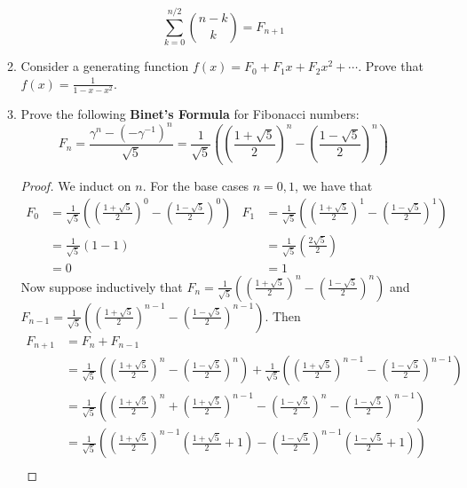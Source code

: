 \documentclass[../apprentice.tex]{subfiles}
\begin{document}
\begin{enumerate}
\begin{enumerate}
        \begin{equation*}
            \sum_{k=0}^{n/2}\binom{n-k}{k} = F_{n+1}
        \end{equation*}
        \item Consider a generating function $f(x)=F_0+F_1x+F_2x^2+\cdots$. Prove that $f(x)=\frac{1}{1-x-x^2}$.
        \item Prove the following \textbf{Binet's Formula} for Fibonacci numbers:
        \begin{equation*}
            F_n = \frac{\gamma^n-(-\gamma^{-1})^n}{\sqrt{5}}
            = \frac{1}{\sqrt{5}}\left( \left( \frac{1+\sqrt{5}}{2} \right)^n-\left( \frac{1-\sqrt{5}}{2} \right)^n \right)
        \end{equation*}
        \begin{proof}
            We induct on $n$. For the base cases $n=0,1$, we have that
            \begin{align*}
                F_0 &= \frac{1}{\sqrt{5}}\left( \left( \frac{1+\sqrt{5}}{2} \right)^0-\left( \frac{1-\sqrt{5}}{2} \right)^0 \right)&
                    F_1 &= \frac{1}{\sqrt{5}}\left( \left( \frac{1+\sqrt{5}}{2} \right)^1-\left( \frac{1-\sqrt{5}}{2} \right)^1 \right)\\
                &= \frac{1}{\sqrt{5}}(1-1)&
                    &= \frac{1}{\sqrt{5}}\left( \frac{2\sqrt{5}}{2} \right)\\
                &= 0&
                    &= 1
            \end{align*}
            Now suppose inductively that $F_n=\frac{1}{\sqrt{5}}\left( \left( \frac{1+\sqrt{5}}{2} \right)^n-\left( \frac{1-\sqrt{5}}{2} \right)^n \right)$ and $F_{n-1}=\frac{1}{\sqrt{5}}\left( \left( \frac{1+\sqrt{5}}{2} \right)^{n-1}-\left( \frac{1-\sqrt{5}}{2} \right)^{n-1} \right)$. Then
            \begingroup
            \allowdisplaybreaks
            \begin{align*}
                F_{n+1} &= F_n+F_{n-1}\\
                &= \frac{1}{\sqrt{5}}\left( \left( \frac{1+\sqrt{5}}{2} \right)^n-\left( \frac{1-\sqrt{5}}{2} \right)^n \right)+\frac{1}{\sqrt{5}}\left( \left( \frac{1+\sqrt{5}}{2} \right)^{n-1}-\left( \frac{1-\sqrt{5}}{2} \right)^{n-1} \right)\\
                &= \frac{1}{\sqrt{5}}\left( \left( \frac{1+\sqrt{5}}{2} \right)^n+\left( \frac{1+\sqrt{5}}{2} \right)^{n-1}-\left( \frac{1-\sqrt{5}}{2} \right)^n-\left( \frac{1-\sqrt{5}}{2} \right)^{n-1} \right)\\
                &= \frac{1}{\sqrt{5}}\left( \left( \frac{1+\sqrt{5}}{2} \right)^{n-1}\left( \frac{1+\sqrt{5}}{2}+1 \right)-\left( \frac{1-\sqrt{5}}{2} \right)^{n-1}\left( \frac{1-\sqrt{5}}{2}+1 \right) \right)\\

\end{align*}
\end{proof}
\end{enumerate}
\end{enumerate}
\end{document}
